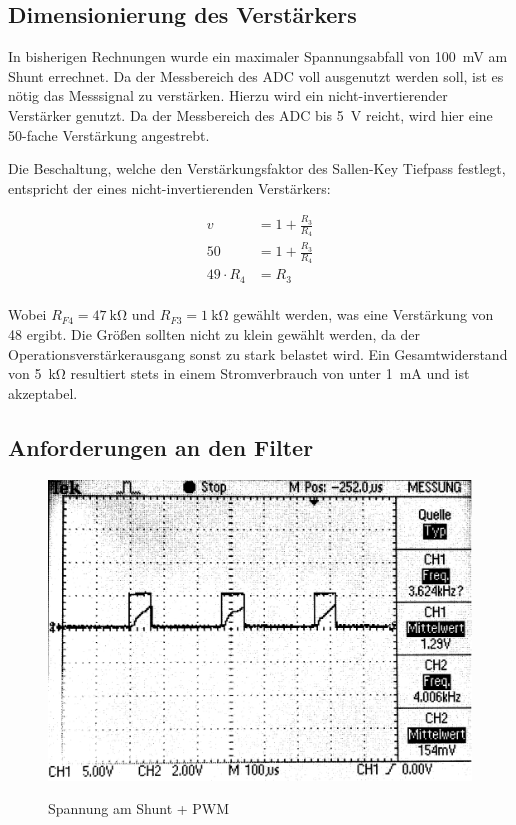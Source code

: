 \subsection{Dimensionierung des Verstärkers}

In bisherigen Rechnungen wurde ein maximaler Spannungsabfall von \SI{100}{\milli\volt} am Shunt errechnet. Da der Messbereich des ADC voll ausgenutzt werden soll,
ist es nötig das Messsignal zu verstärken. Hierzu wird ein nicht-invertierender Verstärker genutzt. Da der Messbereich des ADC bis \SI{5}{\volt} reicht, wird hier eine 
50-fache Verstärkung angestrebt.

Die Beschaltung, welche den Verstärkungsfaktor des Sallen-Key Tiefpass festlegt, entspricht der eines nicht-invertierenden Verstärkers:

\begin{align*}
v &= 1 + \frac{R_{3}}{R_{4}}\\
50 &= 1 + \frac{R_{3}}{R_{4}}\\
49\cdot R_{4} &= R_{3}
\end{align*}
\\
Wobei $R_{F4} = \SI{47}{\kilo\ohm}$ und $R_{F3} = \SI{1}{\kilo\ohm}$  gewählt werden, was eine Ver\-stär\-kung von 48 ergibt. Die Größen sollten nicht zu klein gewählt werden, 
da der Operationsverstärkerausgang sonst zu stark belastet wird. Ein Gesamtwiderstand von \SI{5}{\kilo\ohm} resultiert stets in einem Stromverbrauch von unter \SI{1}{\milli\ampere} und ist
akzeptabel.


\subsection{Anforderungen an den Filter}

\begin{figure}[H]
\centering
\includegraphics[width=.8\textwidth]{oszi.png}\\
\caption{Spannung am Shunt + PWM}%
\label{fig:pwm+i2}
\end{figure}

